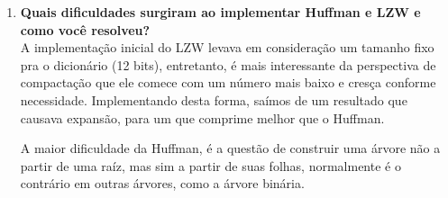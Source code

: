 \documentclass[12pt]{article}
\begin{document}
\begin{enumerate}
\begin{enumerate}
        \item \textbf{Interpretação do resultado} \\
        O algorítmo de comprtessão LZW apresentou melhor compressão em relação ao Huffman, um resultado inesperado, mas parando para analisar, o LZW é muito bom em compressão de texto, já que cria um dicionário que muda a medida que o arquivo é analisado, por exemplo, detectando padrões em palavras/sílabas repetidas, e com esses padrões, um único código pode representar um trecho inteiro. Huffman analisa e encurta símbolos isolados com base na frequência.
        A diferença é clara quando você compara os dois, traduz-se em 20\% de diferença na compressão.
    \end{enumerate}

    \item \textbf{Quais dificuldades surgiram ao implementar Huffman e LZW e como você resolveu?} \\
    A implementação inicial do LZW levava em consideração um tamanho fixo pra o dicionário (12 bits), entretanto, é mais interessante da perspectiva de compactação que ele comece com um número mais baixo e cresça conforme necessidade. Implementando desta forma, saímos de um resultado que causava expansão, para um que comprime melhor que o Huffman.

    A maior dificuldade da Huffman, é a questão de construir uma árvore não a partir de uma raíz, mas sim a partir de suas folhas, normalmente é o contrário em outras árvores, como a árvore binária.
\end{enumerate}
\end{document}
